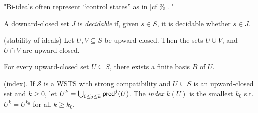 "Bi-ideals often represent “control states” as in [cf \%]. "

\fi

A downard-closed set $J$ is {\em decidable} if, given $s \in S$, it is decidable whether
$s \in J$. 

\begin{claim}{(stability of ideals)}
Let $U, V \subseteq S$ be upward-closed. Then the sets $U \cup V$, and $U \cap V$ are upward-closed.
\end{claim}



\begin{fact}\label{fact basis}
For every upward-closed set $U \subseteq S$, there exists a finite basis $B$ of $U$. 
\end{fact}


\begin{definition}{ (index)}. 
If $\mathscr{S}$ is a WSTS with strong compatibility and $U \subseteq S$  is an upward-closed set and $k \geq 0$, let $U^k= \bigcup_{0 \leq j \leq k} \textsf{pred}^j(U)$.
The {\em index} $k(U)$ is the
smallest $k_0$ s.t. $U^k = U^{k_0}$ for all $k \geq k_0$.
\end{definition}


